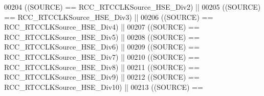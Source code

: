 \begin{DoxyCode}
00204                                       \textcolor{preprocessor}{(}\textcolor{preprocessor}{(}\textcolor{preprocessor}{SOURCE}\textcolor{preprocessor}{)} \textcolor{preprocessor}{==} 
      RCC_RTCCLKSource_HSE_Div2\textcolor{preprocessor}{)} \textcolor{preprocessor}{||}
00205                                       \textcolor{preprocessor}{(}\textcolor{preprocessor}{(}\textcolor{preprocessor}{SOURCE}\textcolor{preprocessor}{)} \textcolor{preprocessor}{==} 
      RCC_RTCCLKSource_HSE_Div3\textcolor{preprocessor}{)} \textcolor{preprocessor}{||}
00206                                       \textcolor{preprocessor}{(}\textcolor{preprocessor}{(}\textcolor{preprocessor}{SOURCE}\textcolor{preprocessor}{)} \textcolor{preprocessor}{==} 
      RCC_RTCCLKSource_HSE_Div4\textcolor{preprocessor}{)} \textcolor{preprocessor}{||}
00207                                       \textcolor{preprocessor}{(}\textcolor{preprocessor}{(}\textcolor{preprocessor}{SOURCE}\textcolor{preprocessor}{)} \textcolor{preprocessor}{==} 
      RCC_RTCCLKSource_HSE_Div5\textcolor{preprocessor}{)} \textcolor{preprocessor}{||}
00208                                       \textcolor{preprocessor}{(}\textcolor{preprocessor}{(}\textcolor{preprocessor}{SOURCE}\textcolor{preprocessor}{)} \textcolor{preprocessor}{==} 
      RCC_RTCCLKSource_HSE_Div6\textcolor{preprocessor}{)} \textcolor{preprocessor}{||}
00209                                       \textcolor{preprocessor}{(}\textcolor{preprocessor}{(}\textcolor{preprocessor}{SOURCE}\textcolor{preprocessor}{)} \textcolor{preprocessor}{==} 
      RCC_RTCCLKSource_HSE_Div7\textcolor{preprocessor}{)} \textcolor{preprocessor}{||}
00210                                       \textcolor{preprocessor}{(}\textcolor{preprocessor}{(}\textcolor{preprocessor}{SOURCE}\textcolor{preprocessor}{)} \textcolor{preprocessor}{==} 
      RCC_RTCCLKSource_HSE_Div8\textcolor{preprocessor}{)} \textcolor{preprocessor}{||}
00211                                       \textcolor{preprocessor}{(}\textcolor{preprocessor}{(}\textcolor{preprocessor}{SOURCE}\textcolor{preprocessor}{)} \textcolor{preprocessor}{==} 
      RCC_RTCCLKSource_HSE_Div9\textcolor{preprocessor}{)} \textcolor{preprocessor}{||}
00212                                       \textcolor{preprocessor}{(}\textcolor{preprocessor}{(}\textcolor{preprocessor}{SOURCE}\textcolor{preprocessor}{)} \textcolor{preprocessor}{==} 
      RCC_RTCCLKSource_HSE_Div10\textcolor{preprocessor}{)} \textcolor{preprocessor}{||}
00213                                       \textcolor{preprocessor}{(}\textcolor{preprocessor}{(}\textcolor{preprocessor}{SOURCE}\textcolor{preprocessor}{)} \textcolor{preprocessor}{==} 

\end{DoxyCode}
